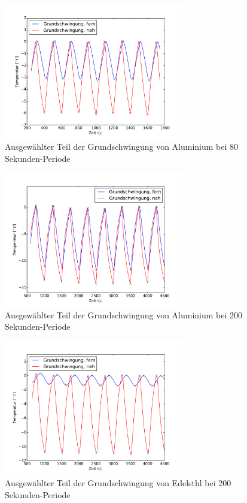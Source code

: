 \begin{figure}[p]
	\label{fig:M2AluNormkurve}
	\centering
	\includegraphics[width=0.7\textwidth]{Bilder/M2_Alu_norm.pdf}
	\caption{Ausgewählter Teil der Grundschwingung von Aluminium bei 80 Sekunden-Periode}
\end{figure}
\begin{figure}[p]
	\label{fig:M3AluNormkurve}
	\centering
	\includegraphics[width=0.7\textwidth]{Bilder/M3_Alu_norm.pdf}
	\caption{Ausgewählter Teil der Grundschwingung von Aluminium bei 200 Sekunden-Periode}
\end{figure}
\begin{figure}[p]
	\label{fig:M3EdelstahlNormkurve}
	\centering
	\includegraphics[width=0.7\textwidth]{Bilder/M3_Edelstahl_norm.pdf}
	\caption{Ausgewählter Teil der Grundschwingung von Edelsthl bei 200 Sekunden-Periode}
\end{figure}
